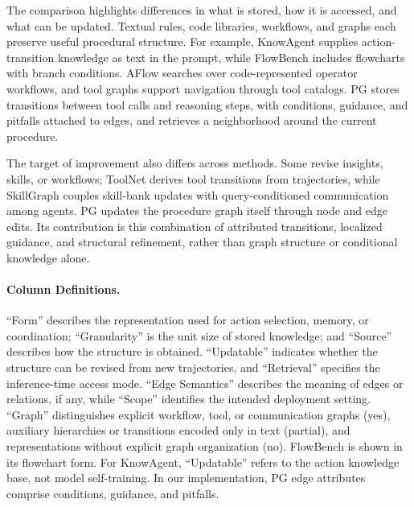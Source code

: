 The comparison highlights differences in what is stored, how it is accessed, and what can be updated. Textual rules, code libraries, workflows, and graphs each preserve useful procedural structure. For example, KnowAgent supplies action-transition knowledge as text in the prompt, while FlowBench includes flowcharts with branch conditions. AFlow searches over code-represented operator workflows, and tool graphs support navigation through tool catalogs. PG stores transitions between tool calls and reasoning steps, with conditions, guidance, and pitfalls attached to edges, and retrieves a neighborhood around the current procedure.

The target of improvement also differs across methods. Some revise insights, skills, or workflows; ToolNet derives tool transitions from trajectories, while SkillGraph couples skill-bank updates with query-conditioned communication among agents. PG updates the procedure graph itself through node and edge edits. Its contribution is this combination of attributed transitions, localized guidance, and structural refinement, rather than graph structure or conditional knowledge alone.

\paragraph{Column Definitions.}
``Form'' describes the representation used for action selection, memory, or coordination; ``Granularity'' is the unit size of stored knowledge; and ``Source'' describes how the structure is obtained. ``Updatable'' indicates whether the structure can be revised from new trajectories, and ``Retrieval'' specifies the inference-time access mode. ``Edge Semantics'' describes the meaning of edges or relations, if any, while ``Scope'' identifies the intended deployment setting. ``Graph'' distinguishes explicit workflow, tool, or communication graphs (yes), auxiliary hierarchies or transitions encoded only in text (partial), and representations without explicit graph organization (no). FlowBench is shown in its flowchart form. For KnowAgent, ``Updatable'' refers to the action knowledge base, not model self-training. In our implementation, PG edge attributes comprise conditions, guidance, and pitfalls.

